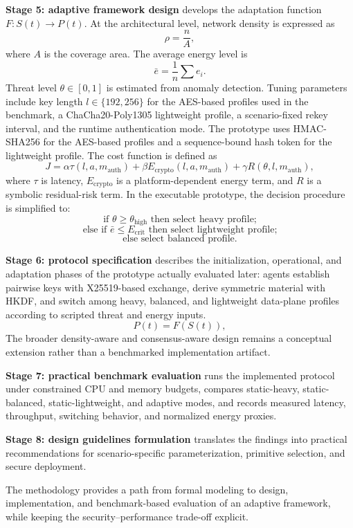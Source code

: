 \textbf{Stage 5: adaptive framework design} develops the adaptation function $F: S(t) \rightarrow P(t)$. At the architectural level, network density is expressed as
\begin{equation}
\rho = \frac{n}{A},
\label{eq:density}
\end{equation}
where $A$ is the coverage area. The average energy level is
\begin{equation}
\bar{e} = \frac{1}{n}\sum e_i.
\label{eq:avg_energy}
\end{equation}
Threat level $\theta \in [0,1]$ is estimated from anomaly detection. Tuning parameters include key length $l \in \{192,256\}$ for the AES-based profiles used in the benchmark, a ChaCha20-Poly1305 lightweight profile, a scenario-fixed rekey interval, and the runtime authentication mode. The prototype uses HMAC-SHA256 for the AES-based profiles and a sequence-bound hash token for the lightweight profile. The cost function is defined as
\begin{equation}
J = \alpha \tau(l,a,m_{\mathrm{auth}}) + \beta E_{\mathrm{crypto}}(l,a,m_{\mathrm{auth}}) + \gamma R(\theta,l,m_{\mathrm{auth}}),
\label{eq:cost_function}
\end{equation}
where $\tau$ is latency, $E_{\mathrm{crypto}}$ is a platform-dependent energy term, and $R$ is a symbolic residual-risk term. In the executable prototype, the decision procedure is simplified to:
\[
\text{if } \theta \geq \theta_{\mathrm{high}} \text{ then select heavy profile;}
\]
\[
\text{else if } \bar{e} \leq E_{\mathrm{crit}} \text{ then select lightweight profile;}
\]
\[
\text{else select balanced profile.}
\]

\textbf{Stage 6: protocol specification} describes the initialization, operational, and adaptation phases of the prototype actually evaluated later: agents establish pairwise keys with X25519-based exchange, derive symmetric material with HKDF, and switch among heavy, balanced, and lightweight data-plane profiles according to scripted threat and energy inputs.
\begin{equation}
P(t) = F(S(t)),
\label{eq:adaptation}
\end{equation}
The broader density-aware and consensus-aware design remains a conceptual extension rather than a benchmarked implementation artifact.

\textbf{Stage 7: practical benchmark evaluation} runs the implemented protocol under constrained CPU and memory budgets, compares static-heavy, static-balanced, static-lightweight, and adaptive modes, and records measured latency, throughput, switching behavior, and normalized energy proxies.

\textbf{Stage 8: design guidelines formulation} translates the findings into practical recommendations for scenario-specific parameterization, primitive selection, and secure deployment.

The methodology provides a path from formal modeling to design, implementation, and benchmark-based evaluation of an adaptive framework, while keeping the security--performance trade-off explicit.
